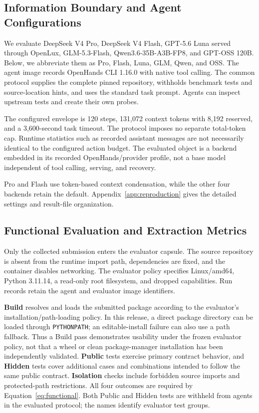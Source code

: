 \documentclass[acmsmall,screen,review,anonymous,nonacm]{acmart}
\begin{document}
\subsection{Information Boundary and Agent Configurations}

We evaluate DeepSeek V4 Pro, DeepSeek V4 Flash, GPT-5.6 Luna served through
OpenLux, GLM-5.3-Flash, Qwen3.6-35B-A3B-FP8, and GPT-OSS 120B. Below, we
abbreviate them as Pro, Flash, Luna, GLM, Qwen, and OSS. The agent image records
OpenHands CLI 1.16.0 with native tool calling. The common protocol supplies the complete pinned repository,
withholds benchmark tests and source-location hints, and uses the standard task
prompt. Agents can inspect upstream tests and create their own probes.

The configured envelope is 120 steps, 131,072 context tokens with 8,192 reserved,
and a 3,600-second task timeout. The protocol imposes no separate total-token
cap. Runtime statistics such as recorded
assistant messages are not necessarily identical to the configured action budget.
The evaluated object is a backend embedded in its recorded OpenHands/provider
profile, not a base model independent of tool calling, serving, and recovery.

Pro and Flash use token-based context condensation, while the other four
backends retain the default. Appendix~\ref{app:reproduction} gives the
detailed settings and result-file organization.


\subsection{Functional Evaluation and Extraction Metrics}

Only the collected submission enters the evaluator capsule. The source
repository is absent from the runtime import path, dependencies are fixed,
and the container disables networking. The evaluator policy specifies
Linux/amd64, Python 3.11.14, a read-only root filesystem, and dropped
capabilities. Run records retain the agent and evaluator image identifiers.

\textbf{Build} resolves and loads the submitted package according to the
evaluator's installation/path-loading policy. In this release, a direct package
directory can be loaded through \texttt{PYTHONPATH}; an editable-install failure
can also use a path fallback. Thus a Build pass demonstrates usability under the
frozen evaluator policy, not that a wheel or clean package-manager installation
has been independently validated. \textbf{Public} tests exercise primary
contract behavior, and \textbf{Hidden} tests cover additional cases and
combinations intended to follow the same public contract. \textbf{Isolation}
checks include forbidden source imports and protected-path restrictions.
All four outcomes are required by Equation~\ref{eq:functional}.
Both Public and Hidden tests are withheld from agents in the evaluated
protocol; the names identify evaluator test groups.
\end{document}
